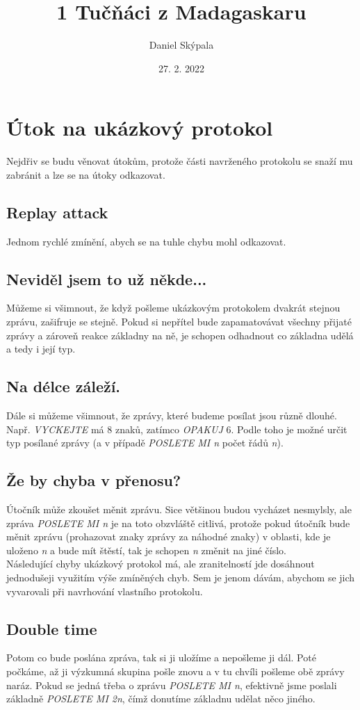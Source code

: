 \documentclass{article}
\title{1 Tučňáci z Madagaskaru}
\author{Daniel Skýpala}
\date{27. 2. 2022}
\begin{document}
\maketitle

\section{Útok na ukázkový protokol}
Nejdřiv se budu věnovat útokům, protože části navrženého protokolu se snaží mu zabránit a lze se na útoky odkazovat.
\subsection{Replay attack}
\label{1.1}
Jednom rychlé zmínění, abych se na tuhle chybu mohl odkazovat.
\subsection{Neviděl jsem to už někde...}
\label{1.2}
Můžeme si všimnout, že když pošleme ukázkovým protokolem dvakrát stejnou zprávu, zašifruje se stejně. Pokud si nepřítel bude zapamatovávat všechny přijaté zprávy
a zároveň reakce základny na ně, je schopen odhadnout co základna udělá a tedy i její typ.
\subsection{Na délce záleží.}
\label{1.3}
Dále si můžeme všimnout, že zprávy, které budeme posílat jsou různě dlouhé. Např. \emph{VYCKEJTE} má 8 znaků, zatímco \emph{OPAKUJ} 6. Podle toho je možné
určit typ posílané zprávy (a v případě \emph{POSLETE MI n} počet řádů \emph{n}).
\subsection{Že by chyba v přenosu?}
\label{1.4}
Útočník může zkoušet měnit zprávu. Sice většinou budou vycházet nesmylsly, ale zpráva \emph{POSLETE MI n} je na toto obzvláště citlivá, protože pokud
útočník bude měnit zprávu (prohazovat znaky zprávy za náhodné znaky) v oblasti, kde je uloženo \emph{n} a bude mít štěstí, tak je schopen \emph{n} změnit na jiné číslo. \\

Následující chyby ukázkový protokol má, ale zranitelností jde dosáhnout jednodušeji využitím výše zmíněných chyb. Sem je jenom dávám, abychom se jich vyvarovali
při navrhování vlastního protokolu.
\subsection{Double time}
\label{1.5}
Potom co bude poslána zpráva, tak si ji uložíme a nepošleme ji dál. Poté počkáme, až ji výzkumná skupina pošle znovu a v tu chvíli pošleme obě zprávy naráz.
Pokud se jedná třeba o zprávu \emph{POSLETE MI n}, efektivně jsme poslali základně \emph{POSLETE MI 2n}, čímž donutíme základnu udělat něco jiného.
\end{document}
